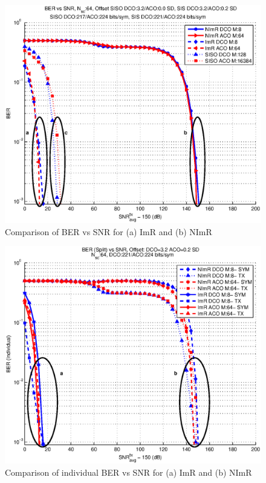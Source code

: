 \documentclass[12pt,letterpaper,onecolumn]{article} %
\begin{document}
\newpage
\begin{figure}[htp]
	\centering
		\includegraphics[trim={0.45in 0.15in 0.7in 0.00in}, clip=false, width=5in]{fig_35_64_all.eps}
	\caption{Comparison of BER vs SNR for (a) ImR and (b) NImR}
\end{figure}

\newpage
\begin{figure}[htp]
	\centering
		\includegraphics[trim={0.45in 0.15in 0.7in 0.00in}, clip=false, width=5in]{fig_35_64_all_s.eps}
	\caption{Comparison of individual BER vs SNR for (a) ImR and (b) NImR}
\end{figure}
\end{document}
